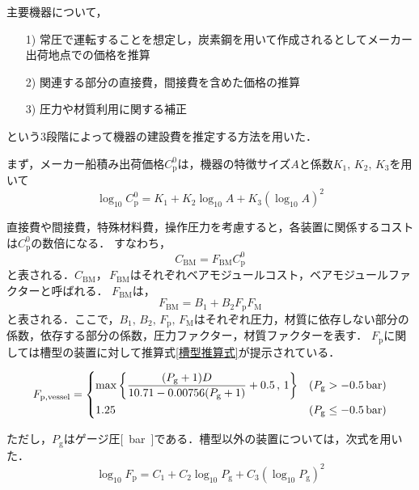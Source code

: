 \documentclass[a4j]{jsreport}
\begin{document}
主要機器について，
\begin{itemize}
    \item[1)]常圧で運転することを想定し，炭素鋼を用いて作成されるとしてメーカー出荷地点での価格を推算
    \item[2)]関連する部分の直接費，間接費を含めた価格の推算
    \item[3)]圧力や材質利用に関する補正
\end{itemize}
という3段階によって機器の建設費を推定する方法を用いた．

まず，メーカー船積み出荷価格$C_\mathrm{p}^0$は，機器の特徴サイズ$A$と係数$K_1, \, K_2, \, K_3$を用いて
\begin{equation}
    \log_{10}C_\mathrm{p}^0 = K_1 + K_2\log_{10} A + K_3(\log_{10} A)^2
\end{equation}

直接費や間接費，特殊材料費，操作圧力を考慮すると，各装置に関係するコストは$C_\mathrm{p}^0$の数倍になる．
すなわち，
\begin{equation}
    C_\mathrm{BM} = F_\mathrm{BM} C_\mathrm{p}^0
\end{equation}
と表される．$C_\mathrm{BM}， \, F_\mathrm{BM}$はそれぞれベアモジュールコスト，ベアモジュールファクターと呼ばれる．
$F_\mathrm{BM}$は，
\begin{equation}
    F_\mathrm{BM} = B_1 + B_2 F_\mathrm{p} F_\mathrm{M}
\end{equation}
と表される．ここで，$B_1, \, B_2, \, F_\mathrm{p}, \, F_\mathrm{M}$はそれぞれ圧力，材質に依存しない部分の係数，依存する部分の係数，圧力ファクター，材質ファクターを表す．
$F_\mathrm{p}$に関しては槽型の装置に対して推算式\eqref{槽型推算式}が提示されている．
\begin{center}
\begin{equation}
    F_\mathrm{p,vessel} =
        \begin{dcases}
            \max \left\{\dfrac{(P_\mathrm{g} + 1 )D}{10.71 - 0.00756(P_\mathrm{g} + 1)}+0.5 \, , \, 1 \right\} & (P_\mathrm{g} > -0.5\, \si{\bar}) \\
            1.25 & (P_\mathrm{g} \leq -0.5\, \si{\bar})
        \end{dcases}
    \label{槽型推算式}
\end{equation}
\end{center}
ただし，$P_\mathrm{g}$はゲージ圧\si{[\bar]}である．槽型以外の装置については，次式を用いた．
\begin{equation}
    \log_{10}F_\mathrm{p} = C_1 + C_2\log_{10} P_\mathrm{g} + C_3(\log_{10} P_\mathrm{g})^2
\end{equation}
\end{document}
